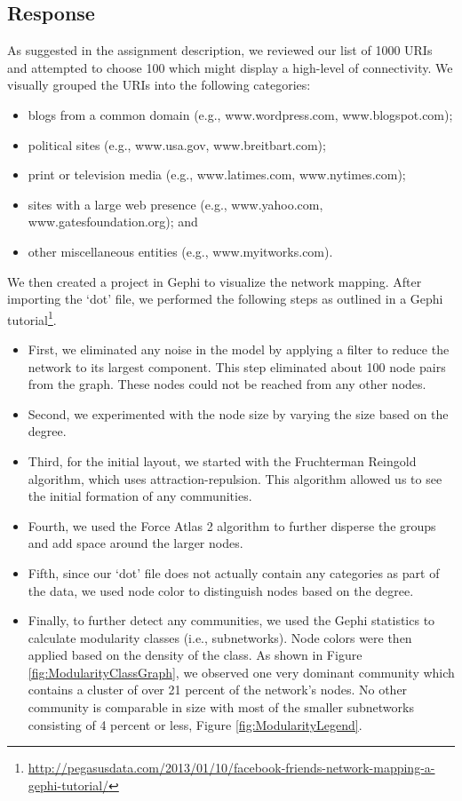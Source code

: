 \documentclass[letterpaper,11pt]{report}
\begin{document}
\begin{savenotes}
\subsection{Response}As suggested in the assignment description, we reviewed our list of 1000 URIs and attempted to choose 100 which might display a high-level of connectivity. We visually grouped the URIs into the following categories:
\begin{itemize}
\item blogs from a common domain (e.g., www.wordpress.com, www.blogspot.com);
\item political sites (e.g., www.usa.gov, www.breitbart.com);
\item print or television media (e.g., www.latimes.com, www.nytimes.com);
\item sites with a large web presence (e.g., www.yahoo.com, www.gatesfoundation.org); and
\item other miscellaneous entities (e.g., www.myitworks.com).
\end{itemize}
We then created a project in Gephi to visualize the network mapping. After importing the `dot' file, we performed the following steps as outlined in a Gephi tutorial\footnote{\url{http://pegasusdata.com/2013/01/10/facebook-friends-network-mapping-a-gephi-tutorial/}}.
\begin{itemize}
\item First, we eliminated any noise in the model by applying a filter to reduce the network to its largest component. This step eliminated about 100 node pairs from the graph. These nodes could not be reached from any other nodes.
\item Second, we experimented with the node size by varying the size based on the degree.
\item Third, for the initial layout, we started with the Fruchterman Reingold algorithm, which uses attraction-repulsion.  This algorithm allowed us to see the initial formation of any communities.
\item Fourth, we used the Force Atlas 2 algorithm to further disperse the groups and add space around the larger nodes.
\item Fifth, since our `dot' file does not actually contain any categories as part of the data, we used node color to distinguish nodes based on the degree.
\item Finally, to further detect any communities, we used the Gephi statistics to calculate modularity classes (i.e., subnetworks). Node colors were then applied based on the density of the class. As shown in Figure \ref{fig:ModularityClassGraph}, we observed one very dominant community which contains a cluster of over 21 percent of the network's nodes. No other community is comparable in size with most of the smaller subnetworks consisting of 4 percent or less, Figure \ref{fig:ModularityLegend}.
\end{itemize}


\end{savenotes}
\end{document}
